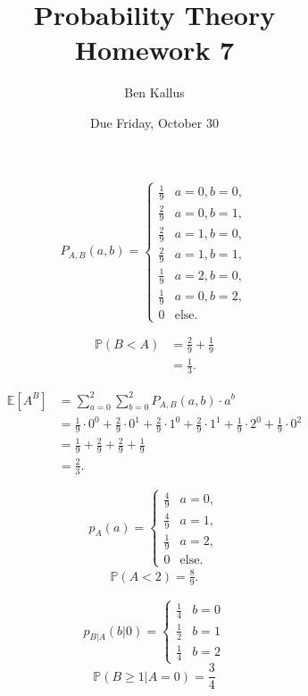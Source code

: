 \documentclass[12pt]{article}
\title{Probability Theory \\ Homework 7}
\author{Ben Kallus}
\date{Due Friday, October 30}
\begin{document}
\pagecolor{black}
\color{white}
\maketitle

 $$P_{A,B}(a,b) =
\begin{cases}
    \frac19 & a = 0, b = 0, \\
    \frac29 & a = 0, b = 1, \\
    \frac29 & a = 1, b = 0, \\
    \frac29 & a = 1, b = 1, \\
    \frac19 & a = 2, b = 0, \\
    \frac19 & a = 0, b = 2, \\
    0 & \text{else.}
\end{cases}$$

\medskip
{}
\begin{align*}
    \mathbb P(B < A) &=\frac29 + \frac19 \\
                     &= \frac13.
\end{align*}

\medskip
{}
\begin{align*}
    \mathbb E[A^B] &= \sum_{a=0}^2 \sum_{b=0}^2 P_{A,B}(a,b) \cdot a^b \\
                   &= \frac19 \cdot 0^0 + \frac29 \cdot 0^1 + \frac29 \cdot 1^0 + \frac29 \cdot 1^1 + \frac19 \cdot 2^0 + \frac19 \cdot 0^2\\
                   &= \frac19 + \frac29 + \frac29 + \frac19 \\
                   &= \frac23.
\end{align*}

\medskip
{} \[p_A(a) = \begin{cases} \frac49 & a = 0, \\
                                           \frac49 & a = 1, \\
                                           \frac19 & a = 2, \\
                                           0 & \text{else.} \end{cases}\]
\begin{align*}
    \mathbb P(A < 2) = \frac89.
\end{align*}

\medskip
{} $$p_{B|A}(b|0) = \begin{cases} \frac14 & b = 0 \\ \frac12 & b = 1 \\ \frac14 & b = 2 \end{cases}$$
$$\mathbb P(B \geq 1|A=0) = \frac34$$
\end{document}
